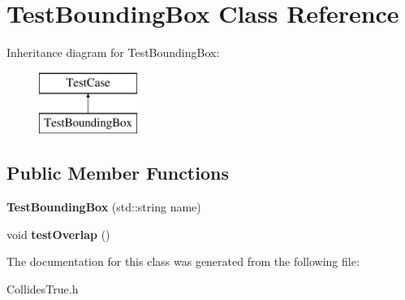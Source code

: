 \hypertarget{classTestBoundingBox}{}\section{Test\+Bounding\+Box Class Reference}
\label{classTestBoundingBox}
Inheritance diagram for Test\+Bounding\+Box\+:\begin{figure}[H]
\begin{center}
\leavevmode
\includegraphics[height=2.000000cm]{classTestBoundingBox}
\end{center}
\end{figure}
\subsection*{Public Member Functions}
\begin{DoxyCompactItemize}
\item 
\mbox{\label{classTestBoundingBox_adb12b1e9837925f231153b871a754c70}} 
{\bfseries Test\+Bounding\+Box} (std\+::string name)
\item 
\mbox{\label{classTestBoundingBox_ac449ddf823b4c456f6ac9f7020540db9}} 
void {\bfseries test\+Overlap} ()
\end{DoxyCompactItemize}


The documentation for this class was generated from the following file\+:\begin{DoxyCompactItemize}
\item 
Collides\+True.\+h\end{DoxyCompactItemize}
